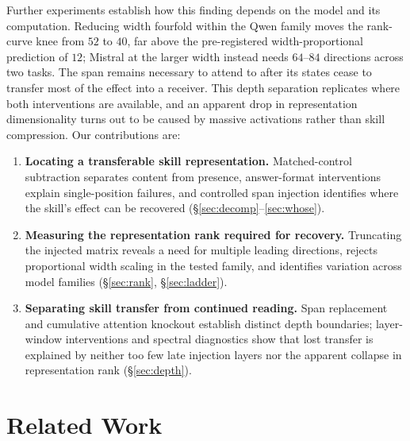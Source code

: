 \documentclass{article}
\begin{document}
Further experiments establish how this finding depends on the model and its
computation. Reducing width fourfold within the Qwen family moves the rank-curve
knee from $52$ to $40$, far above the pre-registered width-proportional prediction
of $12$; Mistral at the larger width instead needs $64$--$84$ directions across
two tasks. The span remains necessary to attend to after its states cease to
transfer most of the effect into a receiver. This depth separation replicates
where both interventions are available, and an apparent drop in representation
dimensionality turns out to be caused by massive activations rather than skill
compression. Our contributions are:
\begin{enumerate}\itemsep0pt\parskip0pt
\item \textbf{Locating a transferable skill representation.} Matched-control
subtraction separates content from presence, answer-format interventions explain
single-position failures, and controlled span injection identifies where the
skill's effect can be recovered (\S\ref{sec:decomp}--\ref{sec:whose}).
\item \textbf{Measuring the representation rank required for recovery.}
Truncating the injected matrix reveals a need for multiple leading directions,
rejects proportional width scaling in the tested family, and identifies
variation across model families (\S\ref{sec:rank}, \S\ref{sec:ladder}).
\item \textbf{Separating skill transfer from continued reading.} Span
replacement and cumulative attention knockout establish distinct depth
boundaries; layer-window interventions and spectral diagnostics show that lost
transfer is explained by neither too few late injection layers nor the apparent
collapse in representation rank (\S\ref{sec:depth}).
\end{enumerate}

\section{Related Work}
\label{sec:related}
\end{document}
